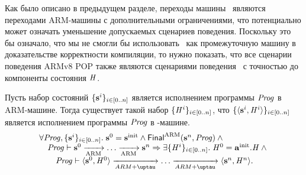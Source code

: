 Как было описано в предыдущем разделе, переходы машины \ARMt~являются
переходами ARM-машины с дополнительными ограничениями, что
потенциально может означать уменьшение допускаемых сценариев поведения.
Поскольку это бы означало, что мы не смогли бы использовать \ARMt~как промежуточную
машину в доказательстве корректности компиляции,
то нужно показать, что все сценарии поведения ARMv8 POP также являются сценариями
поведения \ARMt~с точностью до компоненты состояния $\mathit{H}$.
\begin{theorem}
  \label{thm:armvpop:armt:sim}
Пусть набор состояний $\{\mathbf{s}^i\}_{i \in [0..n]}$ является исполнением программы $\mathit{Prog}$ в ARM-машине.
Тогда существует такой набор $\{\mathit{H}^i\}_{i \in [0..n]}$, что $\{\langle \mathbf{s}^i, \mathit{H}^i \rangle\}_{i \in [0..n]}$
является исполнением программы $\mathit{Prog}$ в \ARMt-машине.
\[\inarr{
\forall \Cfarm, \{\s^i\}_{i \in [0..n]}.\; \s^0 = \sinit  \land \finalStateP(\s^n, \Cfarm) \land{} \\
{} \quad \Cfarm \vdash \s^0 \armStepP \dots \armStepP \s^n \Rightarrow
\exists \{\hmap^i\}_{i \in [0..n]}. \; \hmap^0 = \ainit.\hmap \land {} \\
{} \qquad \Cfarm \vdash \angled{\s^0, \hmap^0} \armStep \dots \armStep \angled{\s^n, \hmap^n}.
}\]
\end{theorem}
